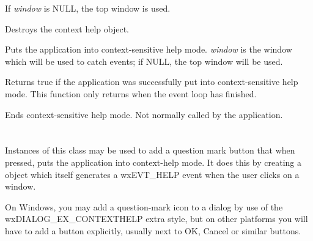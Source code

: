 If {\it window} is NULL, the top window is used.



Destroys the context help object.

\label{wxcontexthelpbegincontexthelp}


Puts the application into context-sensitive help mode. {\it window} is the window
which will be used to catch events; if NULL, the top window will be used.

Returns true if the application was successfully put into context-sensitive help mode.
This function only returns when the event loop has finished.

\label{wxcontexthelpendcontexthelp}


Ends context-sensitive help mode. Not normally called by the application.

\section{}\label{wxcontexthelpbutton}

Instances of this class may be used to add a question mark button that when pressed, puts the
application into context-help mode. It does this by creating a  object which itself
generates a wxEVT\_HELP event when the user clicks on a window.

On Windows, you may add a question-mark icon to a dialog by use of the wxDIALOG\_EX\_CONTEXTHELP extra style, but
on other platforms you will have to add a button explicitly, usually next to OK, Cancel or similar buttons.


\\
\\
\\
\\
\\

